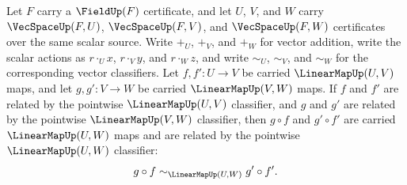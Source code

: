 \begin{theorem}
\label{thm:linmap-composition-classifier-congruence}
Let $F$ carry a $\FieldUp(F)$ certificate, and let $U$, $V$, and $W$ carry $\VecSpaceUp(F,U)$, $\VecSpaceUp(F,V)$, and $\VecSpaceUp(F,W)$ certificates over the same scalar source. Write $+_U$, $+_V$, and $+_W$ for vector addition, write the scalar actions as $r\cdot_U x$, $r\cdot_V y$, and $r\cdot_W z$, and write $\sim_U$, $\sim_V$, and $\sim_W$ for the corresponding vector classifiers. Let $f,f':U\to V$ be carried $\LinearMapUp(U,V)$ maps, and let $g,g':V\to W$ be carried $\LinearMapUp(V,W)$ maps. If $f$ and $f'$ are related by the pointwise $\LinearMapUp(U,V)$ classifier, and $g$ and $g'$ are related by the pointwise $\LinearMapUp(V,W)$ classifier, then $g\circ f$ and $g'\circ f'$ are carried $\LinearMapUp(U,W)$ maps and are related by the pointwise $\LinearMapUp(U,W)$ classifier:
$$
g\circ f\sim_{\LinearMapUp(U,W)}g'\circ f'.
$$
\end{theorem}
